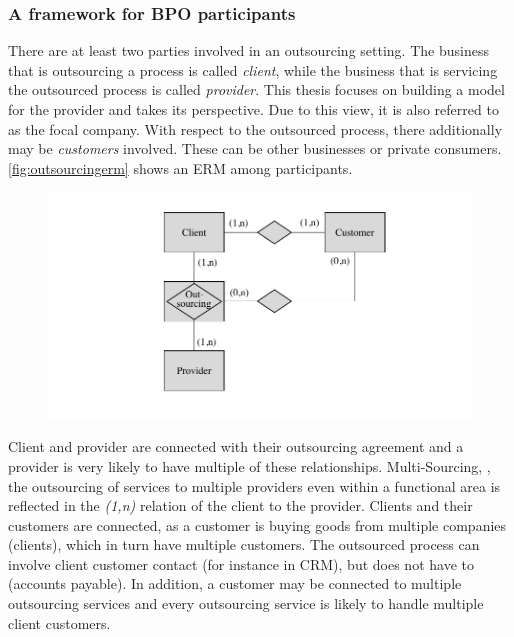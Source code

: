 		\subsubsection{A framework for BPO participants}
		\label{sec:frameworkbpo}
	There are at least two parties involved in an outsourcing setting. The business that is outsourcing a process is called \textit{client}, while the business that is servicing the outsourced process is called \textit{provider}. This thesis focuses on building a model for the provider and takes its perspective. Due to this view, it is also referred to as the focal company. With respect to the outsourced process, there additionally may be \textit{customers} involved. These can be other businesses or private consumers.  \ref{fig:outsourcingerm} shows an \acrfull{ERM} \cite{Chen:1976:ERM} among participants.
			\begin{figure}[caption={Outsourcing ERM}, label={fig:outsourcingERM}]
		{	\includegraphics[width=.8\textwidth]{figures/outsourcingERM.pdf}}
	\end{figure}
	
	Client and provider are connected with their outsourcing agreement and a provider is very likely to have multiple of these relationships. Multi-Sourcing, \ie, the outsourcing of services to multiple providers even within a functional area is reflected in the \textit{(1,n)} relation of the client to the provider. Clients and their customers are connected, as a customer is buying goods from multiple companies (clients), which in turn have multiple customers. The outsourced process can involve client customer contact (for instance in CRM), but does not have to (accounts payable). In addition, a customer may be connected to multiple outsourcing services and every outsourcing service is likely to handle multiple client customers. 
	
